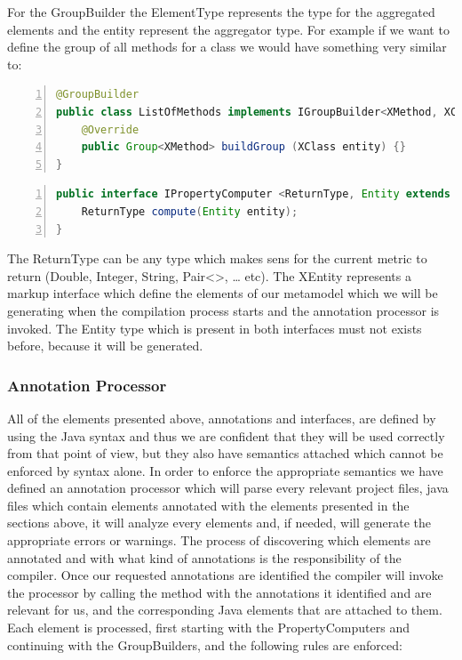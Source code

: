 	For the GroupBuilder the ElementType represents the type for the aggregated
elements and the entity represent the aggregator type. For example if we want to
define the group of all methods for a class we would have something very
similar to:
	\small
\begin{lstlisting}[language=Java,numbers=left]
@GroupBuilder
public class ListOfMethods implements IGroupBuilder<XMethod, XClass> {
	@Override
	public Group<XMethod> buildGroup (XClass entity) {}
}
\end{lstlisting}
	\normalsize{} 
	
	\small
	\begin{lstlisting}[language=Java,numbers=left]
public interface IPropertyComputer <ReturnType, Entity extends XEntity> {
	ReturnType compute(Entity entity);
}	
	\end{lstlisting}
	\normalsize{} \label{codeSection:IPropertyComputer}
	
	The ReturnType can be any type which makes sens for the current metric
to return (Double, Integer, String, Pair<>, \ldots{} etc). 
	The XEntity represents a markup interface which define the elements of our
metamodel which we will be generating when the compilation process starts and
the annotation processor is invoked. The Entity type which is present in both 
interfaces must not exists before, because it will be generated.
		
\subsubsection{Annotation Processor}
	
	All of the elements presented above, annotations and interfaces, are defined 
by using the {J}ava syntax and thus we are confident that they will be used
correctly from that point of view, but they also have semantics attached which
cannot be enforced by syntax alone. In order to enforce the appropriate
semantics we have defined an annotation processor which will parse every
relevant project files, java files which contain elements annotated with the
elements presented in the sections above, it will analyze every elements and, if
needed, will generate the appropriate  errors or warnings.
	The process of discovering which elements are annotated and with what kind of
annotations is the responsibility of the compiler. Once our requested
annotations are identified the compiler will invoke the processor by calling
the 
method with the annotations it identified and are relevant for us, and the
corresponding {J}ava elements that are attached to them. 
	Each element is processed, first starting with the PropertyComputers and
continuing with the GroupBuilders, and the following rules are enforced:
	
